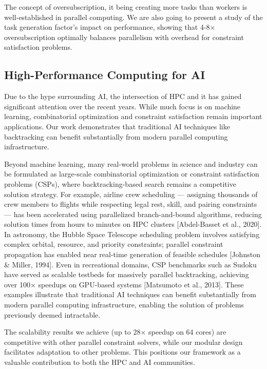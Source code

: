 The concept of oversubscription, it being creating more tasks than workers is well-established in parallel computing. We are also going to present a study of the task generation factor's impact on performance, showing that 4-8× oversubscription optimally balances parallelism with overhead for constraint satisfaction problems.

\subsection{High-Performance Computing for AI}
\label{subsec:hpc_in_ai}
Due to the hype surrounding AI, the intersection of HPC and it has gained significant attention over the recent years. While much focus is on machine learning, combinatorial optimization and constraint satisfaction remain important applications. Our work demonstrates that traditional AI techniques like backtracking can benefit substantially from modern parallel computing infrastructure.


Beyond machine learning, many real-world problems in science and industry can be formulated as large-scale combinatorial optimization or constraint satisfaction problems (CSPs), where backtracking-based search remains a competitive solution strategy. For example, airline crew scheduling — assigning thousands of crew members to flights while respecting legal rest, skill, and pairing constraints — has been accelerated using parallelized branch-and-bound algorithms, reducing solution times from hours to minutes on HPC clusters [Abdel-Basset et al., 2020]. In astronomy, the Hubble Space Telescope scheduling problem involves satisfying complex orbital, resource, and priority constraints; parallel constraint propagation has enabled near real-time generation of feasible schedules [Johnston \& Miller, 1994]. Even in recreational domains, CSP benchmarks such as Sudoku have served as scalable testbeds for massively parallel backtracking, achieving over 100× speedups on GPU-based systems [Matsumoto et al., 2013]. These examples illustrate that traditional AI techniques can benefit substantially from modern parallel computing infrastructure, enabling the solution of problems previously deemed intractable.


The scalability results we achieve (up to 28× speedup on 64 cores) are competitive with other parallel constraint solvers, while our modular design facilitates adaptation to other problems. This positions our framework as a valuable contribution to both the HPC and AI communities.